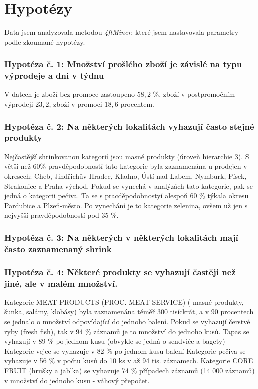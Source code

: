 \section{Hypotézy}

Data jsem analyzovala metodou \emph{4ftMiner}, které jsem nastavovala parametry podle zkoumané hypotézy. 

\subsubsection*{Hypotéza č. 1: Množství prošlého zboží je závislé na typu výprodeje a dni v týdnu}

V datech je zboží bez promoce zastoupeno $58{,}2$ \%, zboží v postpromočním výprodeji $23{,}2$, zboží v promoci $18{,}6$ procentem.

\subsubsection*{Hypotéza č. 2: Na některých lokalitách vyhazují často stejné produkty}

Nejčastější shrinkovanou kategorií jsou masné produkty (úroveň hierarchie 3). S větší než 60\% pravděpodobností tato kategorie byla zaznamenána u prodejen  v okresech: Cheb, Jindřichův Hradec, Kladno, Ústí nad Labem, Nymburk, Písek, Strakonice a Praha-východ. Pokud se vynechá v analýzách tato kategorie, pak se jedná o kategorii pečiva. Ta se s pracděpodobnostyí alespoň 60 \% týkala okresu Pardubice a Plzeň-město. Po vynechání je to kategorie zelenina, ovšem už jen s nejvyšší pravděpodobností pod 35 \%.


\subsubsection*{Hypotéza č. 3: Na některých v některých lokalitách mají často zaznamenaný shrink}
\subsubsection*{Hypotéza č. 4: Některé produkty se vyhazují častěji než jiné, ale v malém množství.}

 Kategorie MEAT PRODUCTS (PROC. MEAT SERVICE)-( masné produkty, šunka, salámy, klobásy) byla zaznamenána téměř 300 tisíckrát, a v 90 procentech se jednalo o množství odpovídající do jednoho balení. 
 Pokud se vyhazují čerstvé ryby (fresh fish), tak v 94 
\% záznamů je to množství do jednoho kusů. Tapas se vyhazují v 89 \% po jednom kusu (obvykle se jedná o sendviče a bagety)
Kategorie vejce se vyhazuje v 82 \% po jednom kusu balení
Kategorie pečiva se vyhazuje v 56 \% v počtu kusů do 10 ks v až 94 tis. záznamech.
Kategorie CORE FRUIT (hrušky a jablka) se vyhazuje 74 \% případech záznamů (14 000 záznamů) v množství do jednoho kusu - váhový přepočet.

